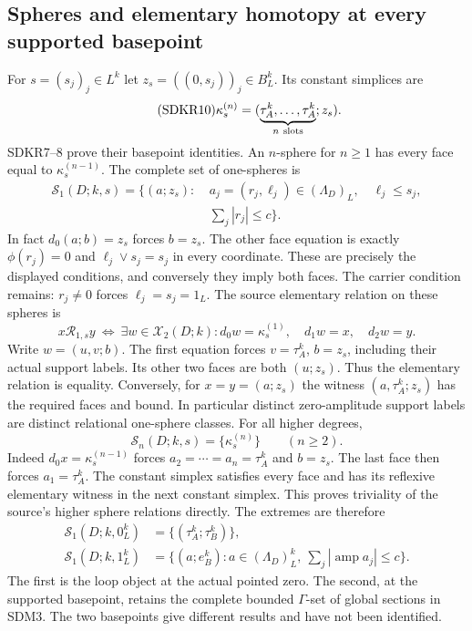 \subsection{Spheres and elementary homotopy at every supported basepoint}
For $s=(s_j)_j\in L^k$ let $z_s=((0,s_j))_j\in B_L^k$.
Its constant simplices are
\begin{equation}\tag{SDKR10}
\kappa_s^{(n)}
=(\underbrace{\tau_A^k,\ldots,\tau_A^k}_{n\ {\rm slots}};z_s).
\end{equation}
SDKR7--8 prove their basepoint identities. An $n$-sphere
for $n\ge1$ has every face equal to $\kappa_s^{(n-1)}$.
The complete set of one-spheres is
\begin{equation}\tag{SDKR11}
\begin{split}
\mathcal S_1(D;k,s)=\biggl\{(a;z_s):\
&a_j=(r_j,\ell_j)\in(\Lambda_D)_L,\quad \ell_j\le s_j,\\
&\sum_j|r_j|\le c\biggr\}.
\end{split}
\end{equation}
In fact $d_0(a;b)=z_s$ forces $b=z_s$. The other face equation
is exactly $\phi(r_j)=0$ and $\ell_j\vee s_j=s_j$ in every
coordinate. These are precisely the displayed conditions,
and conversely they imply both faces. The carrier condition
remains: $r_j\ne0$ forces $\ell_j=s_j=1_L$.
The source elementary relation on these spheres is
\begin{equation}\tag{SDKR12}
x\mathcal R_{1,s}y\ \Longleftrightarrow\
\exists w\in\mathcal X_2(D;k):
d_0w=\kappa_s^{(1)},\quad d_1w=x,\quad d_2w=y.
\end{equation}
Write $w=(u,v;b)$. The first equation forces
$v=\tau_A^k$, $b=z_s$, including their actual support labels.
Its other two faces are both $(u;z_s)$. Thus the elementary
relation is equality. Conversely, for $x=y=(a;z_s)$ the
witness $(a,\tau_A^k;z_s)$ has the required faces and bound.
In particular distinct zero-amplitude support labels are
distinct relational one-sphere classes.
For all higher degrees,
\begin{equation}\tag{SDKR13}
\mathcal S_n(D;k,s)=\{\kappa_s^{(n)}\}\qquad(n\ge2).
\end{equation}
Indeed $d_0x=\kappa_s^{(n-1)}$ forces
$a_2=\cdots=a_n=\tau_A^k$ and $b=z_s$.
The last face then forces $a_1=\tau_A^k$.
The constant simplex satisfies every face and has its reflexive
elementary witness in the next constant simplex. This proves
triviality of the source's higher sphere relations directly.
The extremes are therefore
\begin{equation}\tag{SDKR14}
\begin{aligned}
\mathcal S_1(D;k,0_L^k)&=\{(\tau_A^k;\tau_B^k)\},\\
\mathcal S_1(D;k,1_L^k)
 &=\{(a;e_B^k):a\in(\Lambda_D)_L^k,\
                          \sum_j|\operatorname{amp}a_j|\le c\}.
\end{aligned}
\end{equation}
The first is the loop object at the actual pointed zero.
The second, at the supported basepoint, retains the complete
bounded $\Gamma$-set of global sections in SDM3. The two
basepoints give different results and have not been identified.
